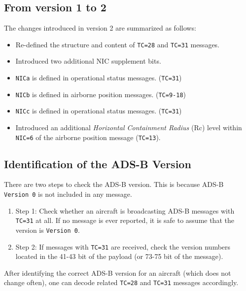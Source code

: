 \subsection{From version 1 to 2}

The changes introduced in version 2 are summarized as follows:

\begin{itemize}
\item
  Re-defined the structure and content of \texttt{TC=28} and \texttt{TC=31} messages.
\item
  Introduced two additional NIC supplement bits.
\item
  \texttt{NICa} is defined in operational status messages.
  (\texttt{TC=31})
\item
  \texttt{NICb} is defined in airborne position messages.
  (\texttt{TC=9-18})
\item
  \texttt{NICc} is defined in operational status messages.
  (\texttt{TC=31})
\item
  Introduced an additional \emph{Horizontal Containment Radius} (Rc) level within \texttt{NIC=6} of the airborne position message (\texttt{TC=13}).
\end{itemize}

\subsection{Identification of the ADS-B Version}

There are two steps to check the ADS-B version. This is because ADS-B \texttt{Version\ 0} is not included in any message.

\begin{enumerate}
\def\labelenumi{\arabic{enumi}.}
\item
  Step 1: Check whether an aircraft is broadcasting ADS-B messages with   \texttt{TC=31} at all. If no message is ever reported, it is safe to assume that the version is \texttt{Version\ 0}.
\item
  Step 2: If messages with \texttt{TC=31} are received, check the version numbers located in the 41-43 bit of the payload (or 73-75 bit of the message).
\end{enumerate}

After identifying the correct ADS-B version for an aircraft (which does not change often), one can decode related \texttt{TC=28} and \texttt{TC=31} messages accordingly.

